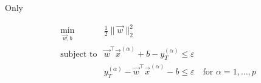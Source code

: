 \begin{frame}{Only}
\begin{itemize}
\begin{enumerate}
{        \begin{equation}
        \begin{array}{ll}
        \min_{\vec w, b} & \frac{1}{2} \lVert \vec w \rVert_{2}^{2}\\
        \text{subject to} & 
        \vec w^{\top} \vec x^{(\alpha)} + b - y_{T}^{(\alpha)} \le \varepsilon\\
        &
        y_{T}^{(\alpha)} - \vec w^{\top} \vec x^{(\alpha)} - b \le \varepsilon \quad \text{for }\alpha=1,\ldots,p
        \end{array}
        \end{equation}  
        }
\end{enumerate}
\end{itemize}
    
\end{frame}

\newpage

